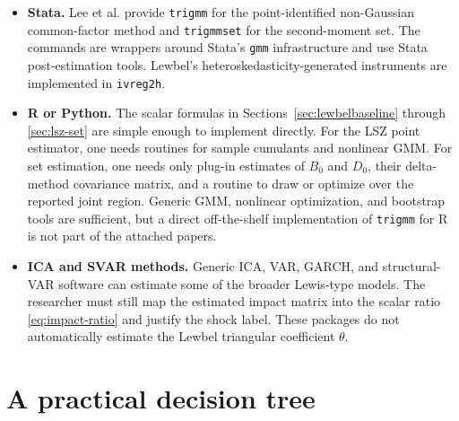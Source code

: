 \documentclass[11pt]{article}
\theoremstyle{plain}
\theoremstyle{definition}
\theoremstyle{remark}
\begin{document}
\begin{itemize}
\item \textbf{Stata.} Lee et al. provide \texttt{trigmm} for the point-identified
non-Gaussian common-factor method and \texttt{trigmmset} for the second-moment
set. The commands are wrappers around Stata's \texttt{gmm} infrastructure and use
Stata post-estimation tools. Lewbel's heteroskedasticity-generated instruments
are implemented in \texttt{ivreg2h}.

\item \textbf{R or Python.} The scalar formulas in Sections~\ref{sec:lewbelbaseline}
through \ref{sec:lsz-set} are simple enough to implement directly. For the LSZ
point estimator, one needs routines for sample cumulants and nonlinear GMM. For
set estimation, one needs only plug-in estimates of $B_0$ and $D_0$, their
delta-method covariance matrix, and a routine to draw or optimize over the
reported joint region. Generic GMM, nonlinear optimization, and bootstrap tools
are sufficient, but a direct off-the-shelf implementation of \texttt{trigmm} for R
is not part of the attached papers.

\item \textbf{ICA and SVAR methods.} Generic ICA, VAR, GARCH, and structural-VAR
software can estimate some of the broader Lewis-type models. The researcher must
still map the estimated impact matrix into the scalar ratio \eqref{eq:impact-ratio}
and justify the shock label. These packages do not automatically estimate the
Lewbel triangular coefficient $\theta$.
\end{itemize}

\section{A practical decision tree}
\label{sec:decision}
\end{document}
